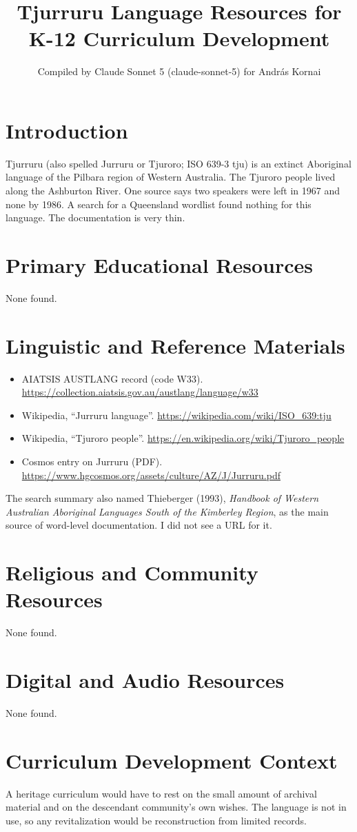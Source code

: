 \documentclass[12pt]{article}
\title{Tjurruru Language Resources for K-12 Curriculum Development}
\author{Compiled by Claude Sonnet 5 (claude-sonnet-5) for Andr\'as Kornai}
\date{}
\begin{document}
\maketitle
\section{Introduction}
Tjurruru (also spelled Jurruru or Tjuroro; ISO 639-3 tju) is an extinct Aboriginal language of the Pilbara region of Western Australia. The Tjuroro people lived along the Ashburton River. One source says two speakers were left in 1967 and none by 1986. A search for a Queensland wordlist found nothing for this language. The documentation is very thin.
\section{Primary Educational Resources}
None found.
\section{Linguistic and Reference Materials}
\begin{itemize}
\item AIATSIS AUSTLANG record (code W33). \url{https://collection.aiatsis.gov.au/austlang/language/w33}
\item Wikipedia, ``Jurruru language''. \url{https://wikipedia.com/wiki/ISO_639:tju}
\item Wikipedia, ``Tjuroro people''. \url{https://en.wikipedia.org/wiki/Tjuroro_people}
\item Cosmos entry on Jurruru (PDF). \url{https://www.hgcosmos.org/assets/culture/AZ/J/Jurruru.pdf}
\end{itemize}
The search summary also named Thieberger (1993), \emph{Handbook of Western Australian Aboriginal Languages South of the Kimberley Region}, as the main source of word-level documentation. I did not see a URL for it.
\section{Religious and Community Resources}
None found.
\section{Digital and Audio Resources}
None found.
\section{Curriculum Development Context}
A heritage curriculum would have to rest on the small amount of archival material and on the descendant community's own wishes. The language is not in use, so any revitalization would be reconstruction from limited records.
\end{document}
